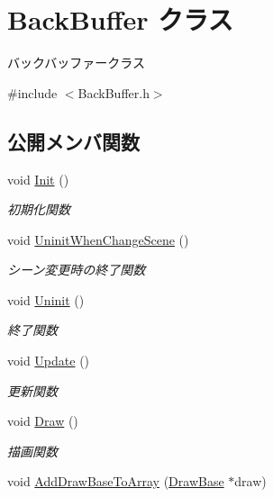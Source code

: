 \hypertarget{class_back_buffer}{}\section{Back\+Buffer クラス}
\label{class_back_buffer}


バックバッファークラス  




{\ttfamily \#include $<$Back\+Buffer.\+h$>$}

\subsection*{公開メンバ関数}
\begin{DoxyCompactItemize}
\item 
void \mbox{\hyperlink{class_back_buffer_a65ac0a652db2a558ecda120ef3f47a10}{Init}} ()
\begin{DoxyCompactList}\small\item\em 初期化関数 \end{DoxyCompactList}\item 
void \mbox{\hyperlink{class_back_buffer_a989c5474cabde7f88c197a2a235e8424}{Uninit\+When\+Change\+Scene}} ()
\begin{DoxyCompactList}\small\item\em シーン変更時の終了関数 \end{DoxyCompactList}\item 
void \mbox{\hyperlink{class_back_buffer_a18f0eebb58ad22bc0514edddf966eea7}{Uninit}} ()
\begin{DoxyCompactList}\small\item\em 終了関数 \end{DoxyCompactList}\item 
void \mbox{\hyperlink{class_back_buffer_a11c7fa5da3d892c72bf6d44e7b269c62}{Update}} ()
\begin{DoxyCompactList}\small\item\em 更新関数 \end{DoxyCompactList}\item 
void \mbox{\hyperlink{class_back_buffer_adb51191c002489e4faac54199449e9ef}{Draw}} ()
\begin{DoxyCompactList}\small\item\em 描画関数 \end{DoxyCompactList}\item 
void \mbox{\hyperlink{class_back_buffer_ab9cae17a69086b467f6e016e432b224b}{Add\+Draw\+Base\+To\+Array}} (\mbox{\hyperlink{class_draw_base}{Draw\+Base}} $\ast$draw)

\end{DoxyCompactItemize}
